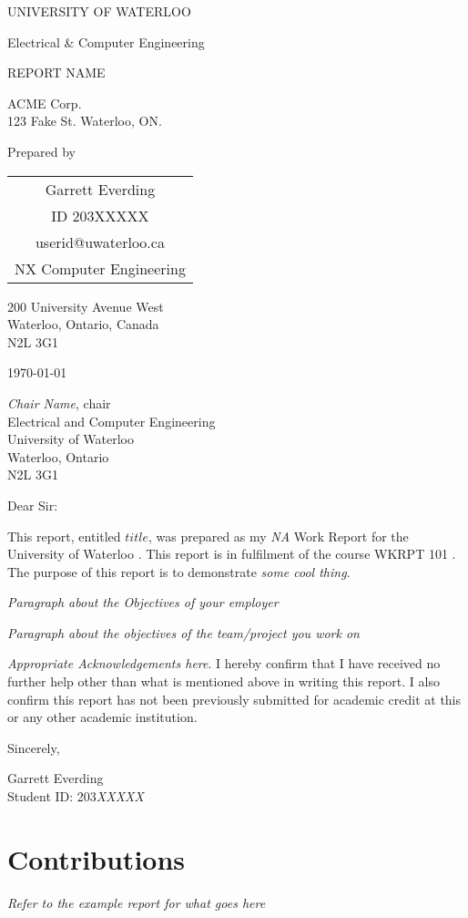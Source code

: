 \documentclass[11pt,]{article}
\date{Month, Day, Year}
\makeatletter
\renewcommand{\maketitle}{%
  \begin{titlepage}
  \begin{singlespacing}
  \let\footnotesize\small
  \let\footnoterule\relax
  \let\footnote\thanks
  \begin{center}
    {\large \MakeTextUppercase{University of Waterloo} \par Electrical \& Computer Engineering}%
  \end{center}
  \null\vfill
  \begin{center}
      {\LARGE  \par}{\huge \MakeTextUppercase{Report Name} \par}%
  \end{center}\par
  \null\vfill
  \begin{center}
    {\large ACME Corp.\\ 123 Fake St. Waterloo, ON.}
  \end{center}\par
  \null\vfill
  \begin{center}
    \large Prepared by\\
      \begin{tabular}[t]{c}
        Garrett Everding \\
          ID 203XXXXX \\ userid@uwaterloo.ca\\ NX Computer Engineering
      \end{tabular}
      \par
    \date{Month, Day, Year}
  \end{center}
  \end{singlespacing}
  \end{titlepage}
}
\makeatother
\begin{document}
\maketitle
\thispagestyle{empty}

\setcounter{page}{1}

\singlespacing

200 University Avenue West \\
Waterloo, Ontario, Canada \\
N2L 3G1 

\today 

\emph{Chair Name}, chair \\
Electrical and Computer Engineering \\
University of Waterloo \\
Waterloo, Ontario \\
N2L 3G1  

Dear Sir:  

This report, entitled \emph{$title$}, was prepared as my \emph{NA} Work Report for the University of Waterloo . This report is in fulfilment of the course WKRPT 101 . The purpose of this report is to demonstrate \emph{some cool thing}.  

\emph{Paragraph about the Objectives of your employer}

\emph{Paragraph about the objectives of the team/project you work on}

\emph{Appropriate Acknowledgements here}.  I hereby confirm that I have received no further help other than what is mentioned above in writing this report. I also confirm this report has not been previously submitted for academic credit at this or any other academic institution.

\vspace*{0.25in}

Sincerely,

\vspace*{0.75in}

Garrett Everding \\
Student ID: 203\emph{XXXXX}


\onehalfspacing
\clearpage



\section*{Contributions}

\emph{Refer to the example report for what goes here}
\end{document}
